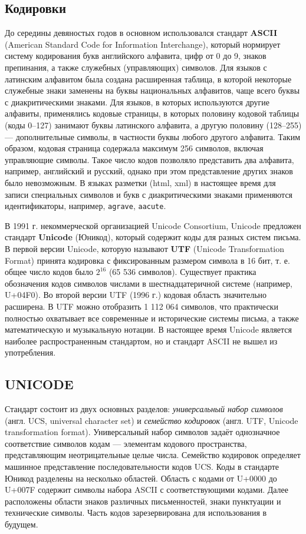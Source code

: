 \documentclass[12pt]{article}
\theoremstyle{definition}
\theoremstyle{remark}
\numberwithin{equation}{section}
\begin{document}
\subsection{Кодировки}
До середины девяностых годов в основном использовался стандарт \textbf{ASCII} (American Standard Code for Information Interchange), который нормирует систему кодирования букв английского алфавита, цифр от 0 до 9, знаков препинания, а также служебных (управляющих) символов. Для языков с латинским алфавитом была создана расширенная таблица, в которой некоторые служебные знаки заменены на буквы национальных алфавитов, чаще всего буквы с диакритическими знаками. Для языков, в которых используются другие алфавиты, применялись кодовые страницы, в которых половину кодовой таблицы (коды 0–127) занимают буквы латинского алфавита, а другую половину (128–255) --- дополнительные символы, в частности буквы любого другого алфавита. Таким образом, кодовая страница содержала максимум 256 символов, включая управляющие символы. Такое число кодов позволяло представить два алфавита, например, английский и русский, однако при этом представление других знаков было невозможным. В языках разметки (html, xml) в настоящее время для записи специальных символов и букв с диакритическими знаками применяются идентификаторы, например, \texttt{agrave}, \texttt{aacute}.

В 1991 г. некоммерческой организацией Unicode Consortium, Unicode предложен стандарт \textbf{Unicode} (Юникод), который содержит коды для разных систем письма.
В первой версии Unicode, которую называют \textbf{UTF} (Unicode Transformation Format) принята кодировка с фиксированным размером символа в 16 бит, т. е. общее число кодов было $2^{16}$ (65 536 символов). Существует практика обозначения кодов символов числами в шестнадцатеричной системе (например, U+04F0).
Во второй версии UTF (1996 г.) кодовая область значительно расширена. В UTF можно отобразить 1 112 064 символов, что практически полностью охватывает все современные и исторические системы письма, а также математическую и музыкальную нотации. В настоящее время Unicode является наиболее распространенным стандартом, но и стандарт ASCII не вышел из употребления.

\subsection{UNICODE}
Стандарт состоит из двух основных разделов: \textit{универсальный набор символов} (англ. UCS, universal character set) и \textit{семейство кодировок} (англ. UTF, Unicode transformation format). Универсальный набор символов задаёт однозначное соответствие символов кодам --- элементам кодового пространства, представляющим неотрицательные целые числа. Семейство кодировок определяет машинное представление последовательности кодов UCS.
Коды в стандарте Юникод разделены на несколько областей. Область с кодами от U+0000 до U+007F содержит символы набора ASCII с соответствующими кодами. Далее расположены области знаков различных письменностей, знаки пунктуации и технические символы. Часть кодов зарезервирована для использования в будущем.
\end{document}
